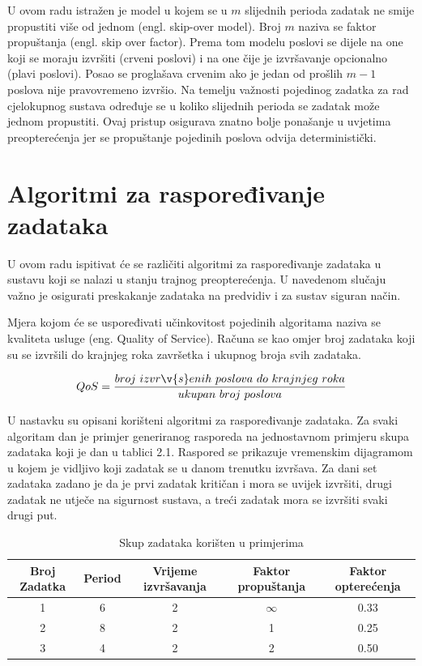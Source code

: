 \documentclass[../zavrsni.tex]{subfiles}
\begin{document}
U ovom radu istražen je model u kojem se u $m$ slijednih perioda zadatak ne smije propustiti više od jednom (engl. skip-over model).
Broj $m$ naziva se faktor propuštanja (engl. skip over factor).
Prema tom modelu 
poslovi se dijele na one koji se moraju izvršiti (crveni poslovi) i na one čije je izvršavanje opcionalno (plavi poslovi). Posao se proglašava crvenim 
ako je jedan od prošlih $m-1$ poslova nije pravovremeno izvršio.
Na temelju važnosti pojedinog zadatka za rad cjelokupnog sustava određuje se u koliko slijednih perioda 
se zadatak može jednom propustiti. Ovaj pristup osigurava znatno bolje ponašanje u uvjetima preopterećenja jer se propuštanje
pojedinih poslova odvija deterministički.

\section{Algoritmi za raspoređivanje zadataka}

U ovom radu ispitivat će se različiti algoritmi za raspoređivanje zadataka u sustavu koji se nalazi u stanju trajnog preopterećenja.
U navedenom slučaju važno je osigurati preskakanje zadataka na predvidiv i za sustav siguran način.

Mjera kojom će se uspoređivati učinkovitost pojedinih algoritama naziva se kvaliteta usluge (eng. Quality of Service).
Računa se kao omjer broj zadataka koji su se izvršili do krajnjeg roka završetka i ukupnog broja svih zadataka.

\begin{equation*}
    QoS = \frac{broj\ izvr\v{s}enih\ poslova\ do\ krajnjeg\ roka}{ukupan\ broj\ poslova}
\end{equation*}

U nastavku su opisani korišteni algoritmi za raspoređivanje zadataka.
Za svaki algoritam dan je primjer generiranog rasporeda na jednostavnom primjeru skupa zadataka koji je dan u tablici 2.1. 
Raspored se prikazuje vremenskim dijagramom u kojem
je vidljivo koji zadatak se u danom trenutku izvršava. 
Za dani set zadataka zadano je da je prvi
zadatak kritičan i mora se uvijek izvršiti, drugi zadatak ne utječe na sigurnost sustava, a treći zadatak mora se izvršiti svaki drugi put.

\begin{table}[h!]
    \begin{center}
      \begin{tabular}{||c || c c c c||} 
       \hline
       Broj Zadatka & Period & Vrijeme izvršavanja & Faktor propuštanja & Faktor opterećenja \\ [0.5ex] 
       \hline\hline
       1 & 6 & 2 & $\infty$ & 0.33 \\ 
       \hline
       2 & 8 & 2 & 1 & 0.25 \\
       \hline
       3 & 4 & 2 & 2 & 0.50 \\
       \hline
      \end{tabular}
    \end{center}
    \caption{\label{tab:table-name}Skup zadataka korišten u primjerima}
    \end{table}
\end{document}
